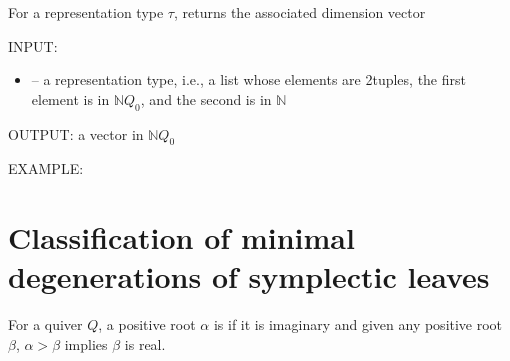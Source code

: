 \documentclass[letterpaper,10pt,english]{sphinxmanual}
\begin{document}
\begin{fulllineitems}
\label{\detokenize{index:quivercombinatorics.ext_dimension_vector}}
\pysigstartsignatures
\pysiglinewithargsret
{}
{}
{}
\pysigstopsignatures
\sphinxAtStartPar
For a representation type \(\tau\), returns the associated dimension vector

\sphinxAtStartPar
INPUT:
\begin{itemize}
\item {} 
\sphinxAtStartPar
{} – a representation type, i.e., a list whose elements are 2\sphinxhyphen{}tuples, the first element is in \(\mathbb{N}Q_0\), and the second is in \(\mathbb{N}\)

\end{itemize}

\sphinxAtStartPar
OUTPUT: a vector in \(\mathbb{N}Q_0\)

\sphinxAtStartPar
EXAMPLE:

\begin{sphinxVerbatim}[commandchars=\\\{\}]
  
   \PYG{p}{[}\PYG{p}{[}  \PYG{p}{]} \PYG{p}{[}  \PYG{p}{]} \PYG{p}{[}  \PYG{p}{]} \PYG{p}{[}  \PYG{p}{]}\PYG{p}{]}
 
   
\end{sphinxVerbatim}

\end{fulllineitems}



\chapter{Classification of minimal degenerations of symplectic leaves}
\label{\detokenize{index:classification-of-minimal-degenerations-of-symplectic-leaves}}
\sphinxAtStartPar
For a quiver \(Q\), a positive root \(\alpha\) is  if it is imaginary and given any positive root \(\beta\), \(\alpha>\beta\) implies \(\beta\) is real.
\end{document}
